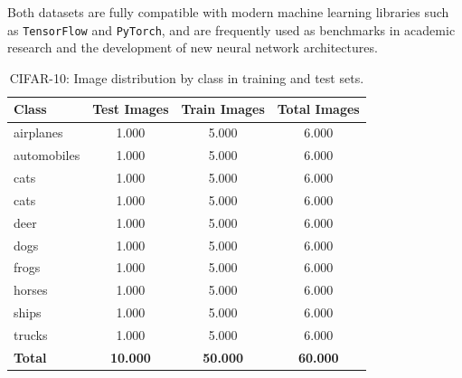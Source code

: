 \documentclass[journal,article,submit,pdftex,moreauthors]{Definitions/mdpi}
\begin{document}
Both datasets are fully compatible with modern machine learning libraries such as \texttt{TensorFlow} and \texttt{PyTorch}, and are frequently used as benchmarks in academic research and the development of new neural network architectures.


\begin{table}[H] 
\caption{CIFAR-10: Image distribution by class in training and test sets.\label{tab:distribuicao_imagens}}
\begin{tabularx}{\textwidth}{lCCC}
\toprule
\textbf{Class} & \textbf{Test Images} & \textbf{Train Images} & \textbf{Total Images} \\
\midrule
airplanes   & 1.000 & 5.000 & 6.000 \\
automobiles & 1.000 & 5.000 & 6.000 \\
cats       & 1.000 & 5.000 & 6.000 \\
cats        & 1.000 & 5.000 & 6.000 \\
deer        & 1.000 & 5.000 & 6.000 \\
dogs        & 1.000 & 5.000 & 6.000 \\
frogs       & 1.000 & 5.000 & 6.000 \\
horses      & 1.000 & 5.000 & 6.000 \\
ships       & 1.000 & 5.000 & 6.000 \\
trucks      & 1.000 & 5.000 & 6.000 \\
\midrule
\textbf{Total} & \textbf{10.000} & \textbf{50.000} & \textbf{60.000} \\
\bottomrule
\end{tabularx}
\end{table}
\end{document}
